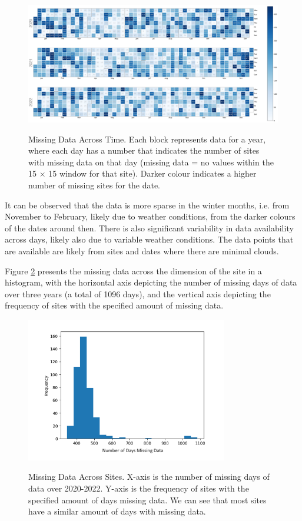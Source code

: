 \documentclass[a4paper,11pt]{report}
\begin{document}
\begin{figure}[H]
  \centering
  \caption{Missing Data Across Time. Each block represents data for a year, where each day has a number that indicates the number of sites with missing data on that day (missing data = no values within the 15 $\times$ 15 window for that site). Darker colour indicates a higher number of missing sites for the date.}
  \includegraphics[width=\textwidth]{images/missing_values_s3_time.png}
  \label{fig:missingdatas3time}
\end{figure}

It can be observed that the data is more sparse in the winter months, i.e. from November to February, likely due to weather conditions, from the darker colours of the dates around then. There is also significant variability in data availability across days, likely also due to variable weather conditions. The data points that are available are likely from sites and dates where there are minimal clouds. 

Figure \ref{fig:missingdatas3site} presents the missing data across the dimension of the site in a histogram, with the horizontal axis depicting the number of missing days of data over three years (a total of 1096 days), and the vertical axis depicting the frequency of sites with the specified amount of missing data. 

\begin{figure}[H]
  \centering
  \caption{Missing Data Across Sites. X-axis is the number of missing days of data over 2020-2022. Y-axis is the frequency of sites with the specified amount of days missing data. We can see that most sites have a similar amount of days with missing data.}
  \includegraphics[width=250pt]{images/missing_values_s3_sites.png}
  \label{fig:missingdatas3site}
\end{figure}
\end{document}
